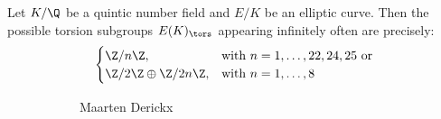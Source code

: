 \begin{frame}[plain]
\begin{thm}
Let $K/\Q$ be a quintic number field and $E/K$ be an elliptic curve. Then the possible torsion subgroups $E(K)_\tors$ appearing infinitely often are precisely:
	\[
	\begin{cases}
	\Z/n\Z, & \text{with } n=1,\ldots,22,24,25 \text{ or} \\
	\Z/2\Z \oplus \Z/2n\Z, & \text{with } n=1,\ldots,8
	\end{cases}
	\]
\end{thm}
	\begin{figure}[h]
	\centering
	\begin{subfigure}{0.3\textwidth}
	\captionsetup{labelformat=empty}
	\centering
	\caption{\hspace{0.1cm}Maarten Derickx}
	\end{subfigure}
	\begin{subfigure}{0.3\textwidth}
	\captionsetup{labelformat=empty}
	\centering

\end{subfigure}
\end{figure}
\end{frame}
